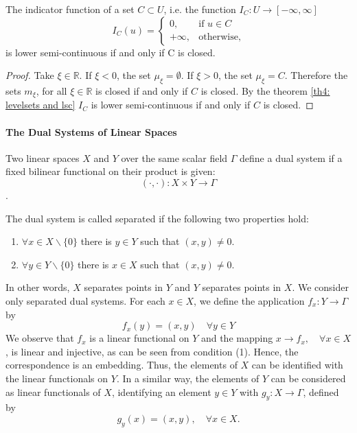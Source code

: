 \begin{example}
The indicator function of a set $C \subset U$, i.e. the function $I_C: U\rightarrow[-\infty, \infty]$
\begin{equation*}
I_C(u)=
\left\lbrace
	\begin{array}{cl}
	0, & \text{if } u \in C \\
	+\infty, & \text{otherwise},
	\end{array}
\right.
\end{equation*}
is lower semi-continuous if and only if C is closed. 
\begin{proof}
	Take $\xi \in \mathbb{R}$.  If $\xi < 0$, the set $\mu_\xi=\emptyset$. If $\xi >0$, the set $\mu_\xi = C$. Therefore the sets $m_\xi$, for all $\xi \in \mathbb{R}$ is closed if and only if $C$ is closed. By the theorem \ref{th4: levelsets and lsc} $I_C$ is lower semi-continuous if and only if $C$ is closed.
\end{proof}
\end{example}


\paragraph{The Dual Systems of Linear Spaces} 
Two linear spaces $X$ and $Y$ over the same scalar field $\Gamma$ define a dual system if a
fixed bilinear functional on their product is given:
\[(\cdot, \cdot) : X \times Y \rightarrow \Gamma\].


The dual system is called separated if the following two properties hold:
\begin{enumerate}
	\item $\forall x \in X \backslash \{0\}$ there is $y \in Y$ such that $(x, y) \neq 0$.
	\item $\forall y \in Y \backslash \{0\}$ there is $x \in X$ such that $(x, y) \neq 0$. 
\end{enumerate}


In other words, $X$ separates points in $Y$ and $Y$ separates points in $X$.
We consider only separated dual systems.
For each $x \in X$, we define the application $f_x: Y \rightarrow \Gamma$ by
\[f_x(y) = (x, y) \quad \forall y \in Y\]
We observe that $f_x$ is a linear functional on $Y$ and the mapping
$x \rightarrow f_x, \quad \forall x \in X$,
is linear and injective, as can be seen from condition (1). Hence, the correspondence is an embedding. Thus, the elements of $X$ can be identified with the linear
functionals on $Y$. In a similar way, the elements of $Y$ can be considered as linear functionals of $X$, identifying an element $y \in Y$ with $g_y: X\rightarrow \Gamma$, defined by
\[g_y(x) = (x, y), \quad \forall x \in X.\]

